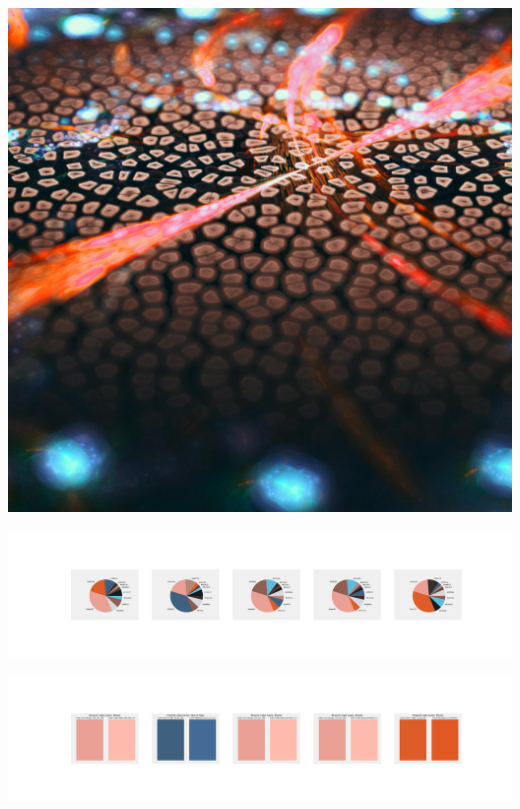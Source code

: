 \documentclass[11pt]{article}
\begin{document}
\begin{landscape}
    \begin{center}
    \includegraphics[width=\textwidth]{./nbimg/file (145).jpg}
    \end{center}

    \begin{center}
    \includegraphics[width=250mm]{./nbimg/pie-51.jpg}
    \end{center}

    \begin{center}
    \includegraphics[width=250mm]{./nbimg/peak-51.jpg}
    \end{center}
    


\end{landscape}
\end{document}

